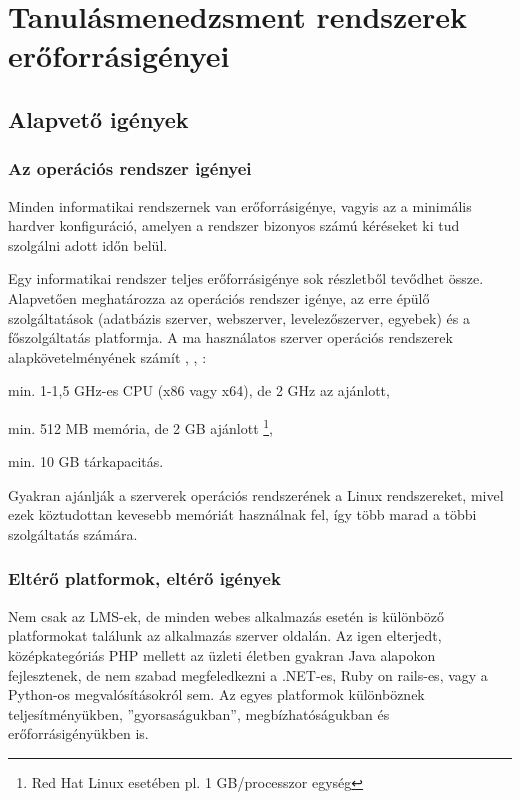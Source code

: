 \chapter{Tanulásmenedzsment rendszerek erőforrásigényei}
\section{Alapvető igények}
\subsection{Az operációs rendszer igényei}
Minden informatikai rendszernek van erőforrásigénye, vagyis az a minimális hardver konfiguráció, amelyen a rendszer bizonyos számú kéréseket ki tud szolgálni adott időn belül.


Egy informatikai rendszer teljes erőforrásigénye sok részletből tevődhet össze. Alapvetően meghatározza az operációs rendszer igénye, az erre épülő szolgáltatások (adatbázis szerver, webszerver, levelezőszerver, egyebek) és a főszolgáltatás platformja.
A ma használatos szerver operációs rendszerek alapkövetelményének számít \cite{ws2008sr}, \cite{ubuntuminhr}, \cite{redhatcaplim}:

\begin{sajat_itemize}
\item min. 1-1,5 GHz-es CPU (x86 vagy x64), de 2 GHz az ajánlott,
\item min. 512 MB memória, de 2 GB ajánlott \footnote{Red Hat Linux esetében pl. 1 GB/processzor egység},
\item min. 10 GB tárkapacitás.
\end{sajat_itemize}

Gyakran ajánlják a szerverek operációs rendszerének a Linux rendszereket, mivel ezek köztudottan kevesebb memóriát használnak fel, így több marad a többi szolgáltatás számára. 

\subsection{Eltérő platformok, eltérő igények}
Nem csak az LMS-ek, de minden webes alkalmazás esetén is különböző platformokat találunk az alkalmazás szerver oldalán. Az igen elterjedt, középkategóriás PHP mellett az üzleti életben gyakran Java alapokon fejlesztenek, de nem szabad megfeledkezni a .NET-es, Ruby on rails-es, vagy a Python-os megvalósításokról sem. Az egyes platformok különböznek teljesítményükben, ''gyorsaságukban'', megbízhatóságukban és erőforrásigényükben is.

